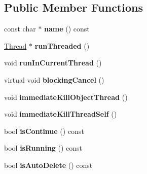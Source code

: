 \subsection*{\-Public \-Member \-Functions}
\begin{DoxyCompactItemize}
\item 
\hypertarget{classgeneral__server_1_1Thread_a1e6279881dcd7abaaf4e4a5f148e4d13}{const char $\ast$ {\bfseries name} () const }\label{classgeneral__server_1_1Thread_a1e6279881dcd7abaaf4e4a5f148e4d13}

\item 
\hypertarget{classgeneral__server_1_1Thread_abfed48996d3fe49e8575af9e98a4b966}{\hyperlink{classgeneral__server_1_1Thread}{\-Thread} $\ast$ {\bfseries run\-Threaded} ()}\label{classgeneral__server_1_1Thread_abfed48996d3fe49e8575af9e98a4b966}

\item 
\hypertarget{classgeneral__server_1_1Thread_aba31d6c489e62b4f76b094f2c43bbfe4}{void {\bfseries run\-In\-Current\-Thread} ()}\label{classgeneral__server_1_1Thread_aba31d6c489e62b4f76b094f2c43bbfe4}

\item 
\hypertarget{classgeneral__server_1_1Thread_afd37dd579b796e2a1c1b85836b0e9042}{virtual void {\bfseries blocking\-Cancel} ()}\label{classgeneral__server_1_1Thread_afd37dd579b796e2a1c1b85836b0e9042}

\item 
\hypertarget{classgeneral__server_1_1Thread_a31cdaf316c815b12f77dd563310a3548}{void {\bfseries immediate\-Kill\-Object\-Thread} ()}\label{classgeneral__server_1_1Thread_a31cdaf316c815b12f77dd563310a3548}

\item 
\hypertarget{classgeneral__server_1_1Thread_ae440b3b1db5cb0353b6f4f9b1b559800}{void {\bfseries immediate\-Kill\-Thread\-Self} ()}\label{classgeneral__server_1_1Thread_ae440b3b1db5cb0353b6f4f9b1b559800}

\item 
\hypertarget{classgeneral__server_1_1Thread_a27dd5be74e1920766b8a345ac2b696ed}{bool {\bfseries is\-Continue} () const }\label{classgeneral__server_1_1Thread_a27dd5be74e1920766b8a345ac2b696ed}

\item 
\hypertarget{classgeneral__server_1_1Thread_a9f4fd117e5ba5bd2c9c7cf3c276f6a66}{bool {\bfseries is\-Running} () const }\label{classgeneral__server_1_1Thread_a9f4fd117e5ba5bd2c9c7cf3c276f6a66}

\item 
\hypertarget{classgeneral__server_1_1Thread_a12a1908e95be781da0dc8f8f51a5046c}{bool {\bfseries is\-Auto\-Delete} () const }\label{classgeneral__server_1_1Thread_a12a1908e95be781da0dc8f8f51a5046c}


\end{DoxyCompactItemize}
